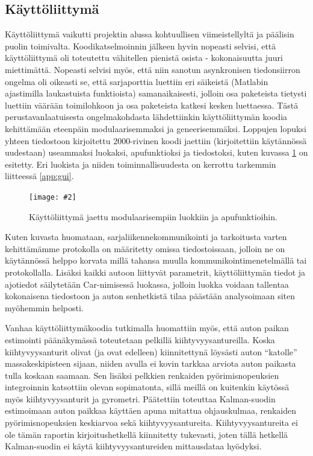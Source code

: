 \documentclass{article}
\newcommand{\kuvaa}[4]{%
	\begin{figure}[h]%
		\centering \texttt{[image: \#2]}%
		\caption{#3 \label{fig:#4}}%
	\end{figure}%
}
\begin{document}
\subsection{Käyttöliittymä}
Käyttöliittymä vaikutti projektin alussa kohtuullisen viimeistellyltä ja päälisin puolin toimivalta. Koodikatselmoinnin jälkeen hyvin nopeasti selvisi, että käyttöliittymä oli toteutettu vähitellen pienistä osista - kokonaisuutta juuri miettimättä. Nopeasti selvisi myös, että niin sanotun asynkronisen tiedonsiirron ongelma oli oikeasti se, että sarjaporttia luettiin eri säikeistä (Matlabin ajastimilla laukastuista funktioista) samanaikaisesti, jolloin osa paketeista tietysti luettiin väärään toimilohkoon ja osa paketeista katkesi kesken luettaessa. Tästä perustavanlaatuisesta ongelmakohdasta lähdettiinkin käyttöliittymän koodia kehittämään eteenpäin modulaarisemmaksi ja geneerisemmäksi. Loppujen lopuksi yhteen tiedostoon kirjoitettu 2000-rivinen koodi jaettiin (kirjoitettiin käytännössä uudestaan) useammaksi luokaksi, apufunktioksi ja tiedostoksi, kuten kuvassa \ref{fig:guitiedostot} on esitetty. Eri luokista ja niiden toiminnallisuudesta on kerrottu tarkemmin liitteessä \ref{app:gui}.

\kuvaa{0.8}{gui_tiedostolistaus}{Käyttöliittymä jaettu modulaarisempiin luokkiin ja apufunktioihin.}{guitiedostot}

Kuten kuvasta huomataan, sarjaliikennekommunikointi ja tarkoitusta varten kehittämämme protokolla on määritetty omissa tiedostoissaan, jolloin ne on käytännössä helppo korvata millä tahansa muulla kommunikointimenetelmällä tai protokollalla. Lisäksi kaikki autoon liittyvät parametrit, käyttöliittymän tiedot ja ajotiedot säilytetään Car-nimisessä luokassa, jolloin luokka voidaan tallentaa kokonaisena tiedostoon ja auton senhetkistä tilaa päästään analysoimaan siten myöhemmin helposti.

Vanhaa käyttöliittymäkoodia tutkimalla huomattiin myös, että auton paikan estimointi päänäkymässä toteutetaan pelkillä kiihtyvyysantureilla. Koska kiihtyvyysanturit olivat (ja ovat edelleen) kiinnitettynä löysästi auton ``katolle'' massakeskipisteen sijaan, niiden avulla ei kovin tarkkaa arviota auton paikasta tulla koskaan saamaan. Sen lisäksi pelkkien renkaiden pyörimisnopeuksien integroinnin katsottiin olevan sopimatonta, sillä meillä on kuitenkin käytössä myös kiihtyvyysanturit ja gyrometri. Päätettiin toteuttaa Kalman-suodin estimoimaan auton paikkaa käyttäen apuna mitattua ohjauskulmaa, renkaiden pyörimisnopeuksien keskiarvoa sekä kiihtyvyysantureita. Kiihtyvyysantureita ei ole tämän raportin kirjoitushetkellä kiinnitetty tukevasti, joten tällä hetkellä Kalman-suodin ei käytä kiihtyvyysantureiden mittausdataa hyödyksi.
\end{document}
